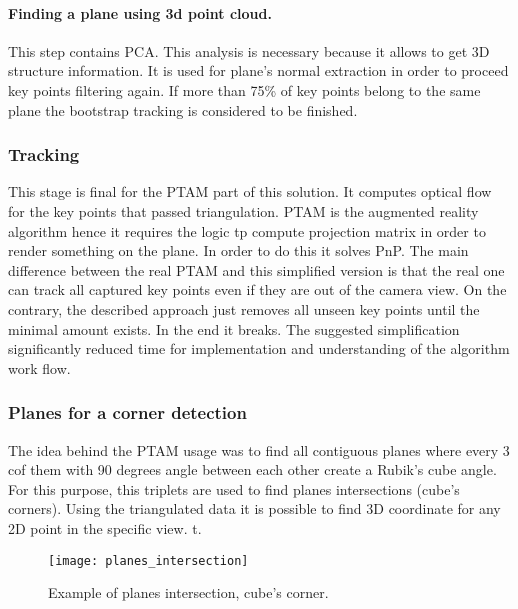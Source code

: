 \documentclass[../../main]{subfiles}
\begin{document}
\paragraph*{Finding a plane using 3d point cloud.}

This step contains \ac{PCA}. This analysis is necessary because it allows to get 3D structure information. It is used for plane's normal extraction in order to proceed key points filtering again. If more than 75\% of key points belong to the same plane the bootstrap tracking is considered to be finished.

\subsubsection{Tracking}

This stage is final for the \ac{PTAM} part of this solution. It computes optical flow for the key points that passed triangulation. \ac{PTAM} is the augmented reality algorithm hence it requires the logic tp compute projection matrix in order to render something on the plane. In order to do this it solves \ac{PnP}.
The main difference between the real \ac{PTAM} and this simplified version is that the real one can track all captured key points even if they are out of the camera view. On the contrary, the described approach just removes all unseen key points until the minimal amount exists. In the end it breaks. The suggested simplification significantly reduced time for implementation and understanding of the algorithm work flow. %

\subsubsection{Planes for a corner detection}

The idea behind the \ac{PTAM} usage was to find all contiguous planes where every 3 cof them with 90 degrees angle between each other create a Rubik's cube angle. For this purpose, this triplets are used to find planes intersections (cube's corners). Using the triangulated data it is possible to find 3D coordinate for any 2D point in the specific view. t.

\begin{figure} [ht]
    \begin{center}
        \texttt{[image: planes\_intersection]}
        \caption{Example of planes intersection, cube's corner.}
        \label{fig:planes_intersection}
    \end{center}
\end{figure}
\end{document}
